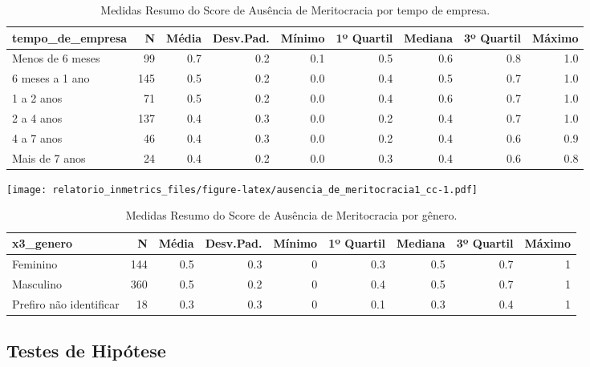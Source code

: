 \documentclass[]{book}
\begin{document}
\begin{table}[t]

\caption{\label{tab:unnamed-chunk-22}Medidas Resumo do Score de Ausência de Meritocracia por tempo de empresa.}
\centering
\fontsize{7}{9}\selectfont
\begin{tabular}{lrrrrrrrr}
\toprule
tempo\_de\_empresa & N & Média & Desv.Pad. & Mínimo & 1º Quartil & Mediana & 3º Quartil & Máximo\\
\midrule
Menos de 6 meses & 99 & 0.7 & 0.2 & 0.1 & 0.5 & 0.6 & 0.8 & 1.0\\
6 meses a 1 ano & 145 & 0.5 & 0.2 & 0.0 & 0.4 & 0.5 & 0.7 & 1.0\\
1 a 2 anos & 71 & 0.5 & 0.2 & 0.0 & 0.4 & 0.6 & 0.7 & 1.0\\
2 a 4 anos & 137 & 0.4 & 0.3 & 0.0 & 0.2 & 0.4 & 0.7 & 1.0\\
4 a 7 anos & 46 & 0.4 & 0.3 & 0.0 & 0.2 & 0.4 & 0.6 & 0.9\\
\addlinespace
Mais de 7 anos & 24 & 0.4 & 0.2 & 0.0 & 0.3 & 0.4 & 0.6 & 0.8\\
\bottomrule
\end{tabular}
\end{table}

\texttt{[image: relatorio\_inmetrics\_files/figure-latex/ausencia\_de\_meritocracia1\_cc-1.pdf]}

\begin{table}[t]

\caption{\label{tab:unnamed-chunk-23}Medidas Resumo do Score de Ausência de Meritocracia por gênero.}
\centering
\fontsize{7}{9}\selectfont
\begin{tabular}{lrrrrrrrr}
\toprule
x3\_genero & N & Média & Desv.Pad. & Mínimo & 1º Quartil & Mediana & 3º Quartil & Máximo\\
\midrule
Feminino & 144 & 0.5 & 0.3 & 0 & 0.3 & 0.5 & 0.7 & 1\\
Masculino & 360 & 0.5 & 0.2 & 0 & 0.4 & 0.5 & 0.7 & 1\\
Prefiro não identificar & 18 & 0.3 & 0.3 & 0 & 0.1 & 0.3 & 0.4 & 1\\
\bottomrule
\end{tabular}
\end{table}

\pagebreak

\hypertarget{testes-de-hipotese-6}{%
\subsection{Testes de Hipótese}\label{testes-de-hipotese-6}}
\end{document}
